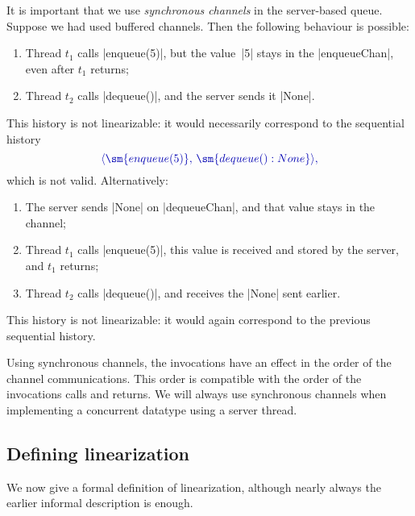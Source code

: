 It is important that we use \emph{synchronous channels} in the server-based
queue.  Suppose we had used buffered channels.  Then the following behaviour
is possible:
%
\begin{enumerate}
\item Thread $t_1$ calls |enqueue(5)|, but the value~|5| stays in the
  |enqueueChan|, even after $t_1$ returns;

\item Thread $t_2$ calls |dequeue()|, and the server sends it |None|.
\end{enumerate}
%
This history is not linearizable: it would necessarily correspond to the
sequential history
\[\mstyle
\seq{ \sm{enqueue(5)},\, \sm{dequeue():None}},
\]
which is not valid.
Alternatively:
%
\begin{enumerate}
\item The server sends |None| on |dequeueChan|, and that value stays in the
  channel; 

\item Thread $t_1$ calls |enqueue(5)|, this value is received and stored
  by the server, and $t_1$ returns;  

\item Thread $t_2$ calls |dequeue()|, and receives the |None| sent earlier.
\end{enumerate}
%
This history is not linearizable: it would again correspond to the previous
sequential history.

Using synchronous channels, the invocations have an effect in the order of the
channel communications.  This order is compatible with the order of the
invocations calls and returns.  We will always use synchronous channels when
implementing a concurrent datatype using a server thread.


\subsection{Defining linearization}

We now give a formal definition of linearization, although nearly always the
earlier informal description is enough.  

